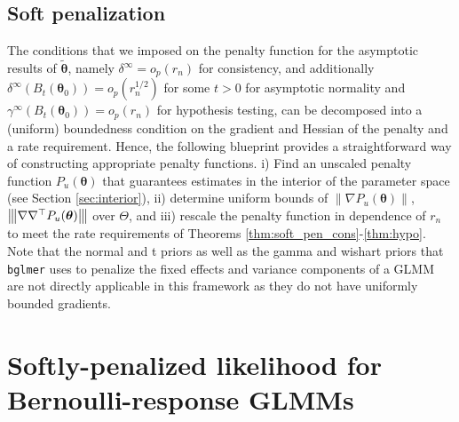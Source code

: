 \documentclass[11pt, a4paper]{article}
\newcommand*{\bb}{\boldsymbol}
\newcommand{\vnorm}[1]{\ensuremath{{\left\| #1 \right\|}}}
\newcommand{\mnorm}[1]{{\left\vert\kern-0.25ex\left\vert\kern-0.25ex\left\vert #1 
		\right\vert\kern-0.25ex\right\vert\kern-0.25ex\right\vert}}
\theoremstyle{example} \newtheorem{example}{Example}[section]
\theoremstyle{theorem} \newtheorem{theorem}{Theorem}[section]
\def\btheta{\bb{\theta}}
\def\btnod{\bb{\theta}_0}
\def\bttilde{\tilde{\bb{\theta}}}
\begin{document}
\subsection{Soft penalization}
\label{sec:soft_pen}
The conditions that we imposed on the penalty function for the asymptotic results of $\bttilde$, namely $\delta^\infty = o_p(r_n)$ for consistency, and additionally $\delta^\infty(B_t(\btnod)) = o_p(r_n^{1/2})$ for some $t>0$ for asymptotic normality and $\gamma^\infty(B_t(\btnod)) = o_p(r_n)$ for hypothesis testing, can be decomposed into a (uniform) boundedness condition on the gradient and Hessian of the penalty and a rate requirement. Hence, the following blueprint provides a straightforward way of constructing appropriate penalty functions. i) Find an unscaled penalty function $P_u(\btheta)$ that guarantees estimates in the interior of the parameter space (see Section \ref{sec:interior}), ii) determine uniform bounds of $\vnorm{\nabla P_u(\btheta)}$, $\mnorm{\nabla \nabla^\top P_u(\btheta)}$ over $\Theta$, and iii) rescale the penalty function in dependence of $r_n$ to meet the rate requirements of Theorems \ref{thm:soft_pen_cons}-\ref{thm:hypo}.
Note that the normal and t priors as well as the gamma and wishart priors that \texttt{bglmer} uses to penalize the fixed effects and variance components of a GLMM are not directly applicable in this framework as they do not have uniformly bounded gradients.
\section{Softly-penalized likelihood for Bernoulli-response GLMMs}
\label{sec:glmm_penalties}
\end{document}
